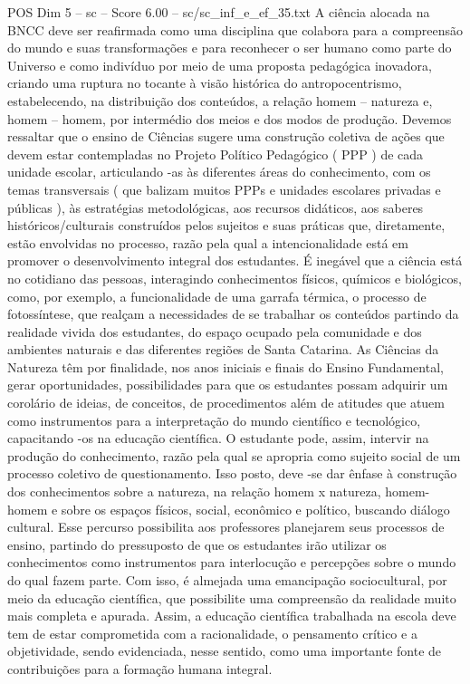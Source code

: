 \begin{textsample}{POS Dim 5 – sc – Score 6.00 – sc/sc\_inf\_e\_ef\_35.txt}
A ciência alocada na BNCC deve ser reafirmada como uma disciplina que colabora para a compreensão do mundo e suas transformações e para reconhecer o ser humano como parte do Universo e como indivíduo por meio de uma proposta pedagógica inovadora, criando uma ruptura no tocante à visão histórica do antropocentrismo, estabelecendo, na distribuição dos conteúdos, a relação homem – natureza e, homem – homem, por intermédio dos meios e dos modos de produção.
Devemos ressaltar que o ensino de Ciências sugere uma construção coletiva de ações que devem estar contempladas no Projeto Político Pedagógico ( PPP ) de cada unidade escolar, articulando -as às diferentes áreas do conhecimento, com os temas transversais ( que balizam muitos PPPs e unidades escolares privadas e públicas ), às estratégias metodológicas, aos recursos didáticos, aos saberes históricos/culturais construídos pelos sujeitos e suas práticas que, diretamente, estão envolvidas no processo, razão pela qual a intencionalidade está em promover o desenvolvimento integral dos estudantes.
É inegável que a ciência está no cotidiano das pessoas, interagindo conhecimentos físicos, químicos e biológicos, como, por exemplo, a funcionalidade de uma garrafa térmica, o processo de fotossíntese, que realçam a necessidades de se trabalhar os conteúdos partindo da realidade vivida dos estudantes, do espaço ocupado pela comunidade e dos ambientes naturais e das diferentes regiões de Santa Catarina.
As Ciências da Natureza têm por finalidade, nos anos iniciais e finais do Ensino Fundamental, gerar oportunidades, possibilidades para que os estudantes possam adquirir um corolário de ideias, de conceitos, de procedimentos além de atitudes que atuem como instrumentos para a interpretação do mundo científico e tecnológico, capacitando -os na educação científica.
O estudante pode, assim, intervir na produção do conhecimento, razão pela qual se apropria como sujeito social de um processo coletivo de questionamento.
Isso posto, deve -se dar ênfase à construção dos conhecimentos sobre a natureza, na relação homem x natureza, homem-homem e sobre os espaços físicos, social, econômico e político, buscando diálogo cultural.
Esse percurso possibilita aos professores planejarem seus processos de ensino, partindo do pressuposto de que os estudantes irão utilizar os conhecimentos como instrumentos para interlocução e percepções sobre o mundo do qual fazem parte.
Com isso, é almejada uma emancipação sociocultural, por meio da educação científica, que possibilite uma compreensão da realidade muito mais completa e apurada.
Assim, a educação científica trabalhada na escola deve tem de estar comprometida com a racionalidade, o pensamento crítico e a objetividade, sendo evidenciada, nesse sentido, como uma importante fonte de contribuições para a formação humana integral.

\end{textsample}
